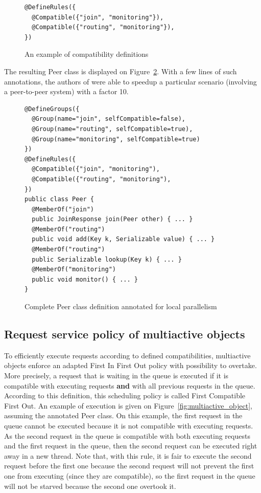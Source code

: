\documentclass[11pt]{report}
\begin{document}
\begin{figure}[!ht]
	\lstset{language=java, numbers=left, numberstyle=\tiny, stepnumber=1, numbersep=5pt, basicstyle=\footnotesize}
	\begin{lstlisting}[frame=single]
@DefineRules({
  @Compatible({"join", "monitoring"}),
  @Compatible({"routing", "monitoring"}),
})
 	\end{lstlisting}
\caption{An example of compatibility definitions}
\label{fig:compatible_annotation}
\end{figure}

The resulting Peer class is displayed on Figure~\ref{fig:annotated_peer_class}. With a few lines of such annotations, the authors of \cite{ref:mao} were able to speedup a particular scenario (involving a peer-to-peer system) with a factor 10.

\begin{figure}[!ht]
	\lstset{language=java, numbers=left, numberstyle=\tiny, stepnumber=1, numbersep=5pt, basicstyle=\footnotesize}
	\begin{lstlisting}[frame=single]
@DefineGroups({
  @Group(name="join", selfCompatible=false),
  @Group(name="routing", selfCompatible=true),
  @Group(name="monitoring", selfCompatible=true)
})
@DefineRules({
  @Compatible({"join", "monitoring"),
  @Compatible({"routing", "monitoring"),
})
public class Peer {
  @MemberOf("join")
  public JoinResponse join(Peer other) { ... }
  @MemberOf("routing")
  public void add(Key k, Serializable value) { ... }
  @MemberOf("routing")
  public Serializable lookup(Key k) { ... }
  @MemberOf("monitoring")
  public void monitor() { ... }
}
 	\end{lstlisting}
\caption{Complete Peer class definition annotated for local parallelism}
\label{fig:annotated_peer_class}
\end{figure}

\subsection{Request service policy of multiactive objects}\label{sec:MAOservice}
To efficiently execute requests according to defined compatibilities, multiactive objects enforce an adapted First In First Out policy with possibility to overtake. More precisely, a request that is waiting in the queue is executed if it is compatible with executing requests \textbf{and} with all previous requests in the queue. According to this definition, this scheduling policy is called First Compatible First Out. An example of execution is given on Figure~\ref{fig:multiactive_object}, assuming the annotated Peer class. On this example, the first request in the queue cannot be executed because it is not compatible with executing requests. As the second request in the queue is compatible with both executing requests and the first request in the queue, then the second request can be executed right away in a new thread. Note that, with this rule, it is fair to execute the second request before the first one because the second request will not prevent the first one from executing (since they are compatible), so the first request in the queue will not be starved because the second one overtook it.
\end{document}
